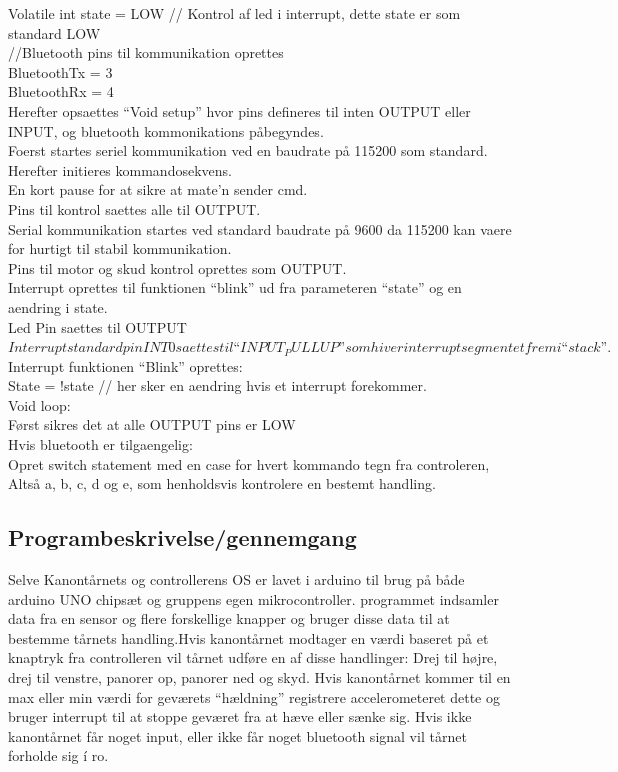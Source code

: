 	Volatile int state = LOW // Kontrol af led i interrupt, dette state er som standard LOW\\

	//Bluetooth pins til kommunikation oprettes\\
	BluetoothTx = 3\\
	BluetoothRx = 4\\

Herefter opsaettes “Void setup” hvor pins defineres til inten OUTPUT eller INPUT, og bluetooth kommonikations påbegyndes.\\
	Foerst startes seriel kommunikation ved en baudrate på 115200 som standard.\\
	Herefter initieres kommandosekvens.\\
	En kort pause for at sikre at mate’n sender cmd.\\
	Pins til kontrol saettes alle til OUTPUT.\\
Serial kommunikation startes ved standard baudrate på 9600 da 115200 kan vaere for  hurtigt til stabil kommunikation.\\
	Pins til motor og skud kontrol oprettes som OUTPUT.\\
	Interrupt oprettes til funktionen “blink” ud fra parameteren “state” og en aendring i state.\\
	Led Pin saettes til OUTPUT\\
$Interrupt standard pin INT0 saettes til “INPUT_PULLUP” som hiver interrupt segmentet frem i “stack”.$\\

Interrupt funktionen “Blink” oprettes:\\
	State = !state // her sker en aendring hvis et interrupt forekommer.\\

Void loop:\\
	Først sikres det at alle OUTPUT pins er LOW\\
	Hvis bluetooth er tilgaengelig:\\
		Opret switch statement med en case for hvert kommando tegn fra controleren,\\
		Altså a, b, c, d og e, som henholdsvis kontrolere en bestemt handling.\\


\subsection{Programbeskrivelse/gennemgang}
Selve Kanontårnets og controllerens OS er lavet i arduino til brug på både arduino UNO chipsæt og gruppens egen mikrocontroller. programmet indsamler data fra en sensor og flere forskellige knapper og bruger disse data til at bestemme tårnets handling.Hvis kanontårnet modtager en værdi baseret på et knaptryk fra controlleren vil tårnet udføre en af disse handlinger: Drej til højre, drej til venstre, panorer op, panorer ned og skyd. Hvis kanontårnet kommer til en max eller min værdi for geværets “hældning” registrere accelerometeret dette og bruger interrupt til at stoppe geværet fra at hæve eller sænke sig. Hvis ikke kanontårnet får noget input, eller ikke får noget bluetooth signal vil tårnet forholde sig í ro.





